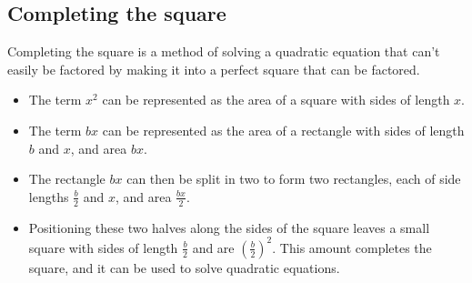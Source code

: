 \documentclass[12pt]{article}
\begin{document}
\newpage

\subsection*{Completing the square}

Completing the square is a method of solving a quadratic equation that can't easily be factored by making it into a perfect square that can be factored.

\begin{itemize}
\item The term $x^2$ can be represented as the area of a square with sides of length $x$.
\item The term $bx$ can be represented as the area of a rectangle with sides of length $b$ and $x$, and area $bx$.
\begin{center}
\end{center}
\item The rectangle $bx$ can then be split in two to form two rectangles, each of side lengths $\frac{b}{2}$ and $x$, and area $\frac{bx}{2}$.
\begin{center}
\end{center}

\newpage

\item Positioning these two halves along the sides of the square leaves a small square with sides of length $\frac{b}{2}$ and are $(\frac{b}{2})^2$. This amount completes the square, and it can be used to solve quadratic equations.
\end{itemize}
\end{document}
